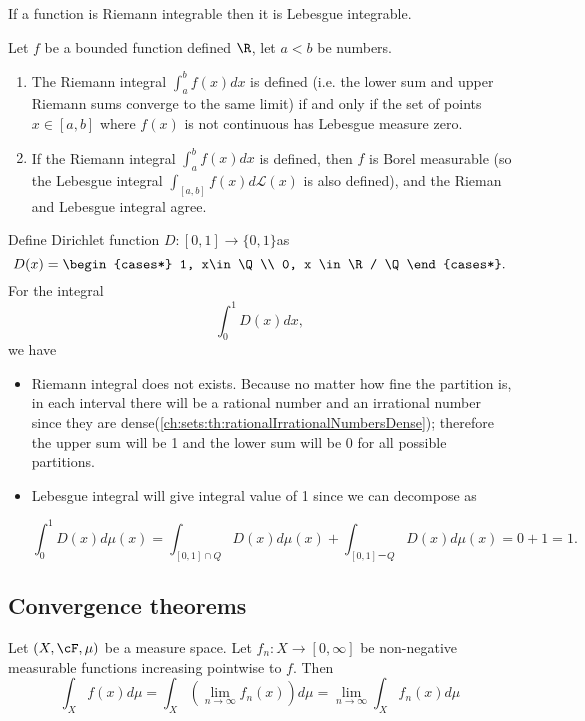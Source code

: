 \begin{refsection}
\begin{lemma}
If a function is Riemann integrable then it is Lebesgue integrable.	
\end{lemma}





Let $f$ be a bounded function defined $\R$, let $a<b$ be numbers.\cite{shreve2004stochastic2}
\begin{enumerate}
    \item The Riemann integral $\int_a^b f(x)dx$ is defined (i.e. the lower sum and upper Riemann sums converge to the same limit) if and only if the set of points $x\in [a,b]$ where $f(x)$ is not continuous has Lebesgue measure zero.
    \item If the Riemann integral $\int_a^b f(x)dx$ is defined, then $f$ is Borel measurable (so the Lebesgue integral $\int_{[a,b]}f(x) d\mathcal{L}(x)$ is also defined), and the Rieman and Lebesgue integral agree. 
\end{enumerate}


\begin{example}\cite[1]{cheng2008crash}
Define Dirichlet function $D:[0,1]\to \{0,1\}$as
$$D(x) = \begin{cases*}
1, x\in \Q\\
0, x \in \R / \Q
\end{cases*}.$$
For the integral 
$$\int_0^1 D(x)dx,$$
we have
\begin{itemize}
	\item Riemann integral does not exists. Because no matter how fine the partition is, in each interval there will be a rational number and an irrational number since they are dense(\autoref{ch:sets:th:rationalIrrationalNumbersDense}); therefore the upper sum will be 1 and the lower sum will be 0 for all possible partitions.
	\item Lebesgue integral will give integral value of 1 since we can decompose as
	
	$$\int_0^1 D(x)d\mu(x) = \int_{[0,1]\cap Q} D(x)d\mu(x) +　\int_{[0,1]－ Q} D(x)d\mu(x) = 0 + 1 = 1.$$ 
\end{itemize}	
\end{example}

\subsection{Convergence theorems}


\begin{theorem}\cite[27]{cheng2008crash}\label{ch:calculus:th:LebesgueFatouTheorem}Let $(X,\cF,\mu)$ be a measure space. Let $f_n: X\to [0,\infty]$ be non-negative measurable functions increasing pointwise to $f$. Then
	$$\int_X f(x) d\mu = \int_X(\lim_{n\to \infty} f_n(x)) d\mu = \lim_{n\to\infty} \int_X f_n(x)d\mu$$
\end{theorem}





\end{refsection}
